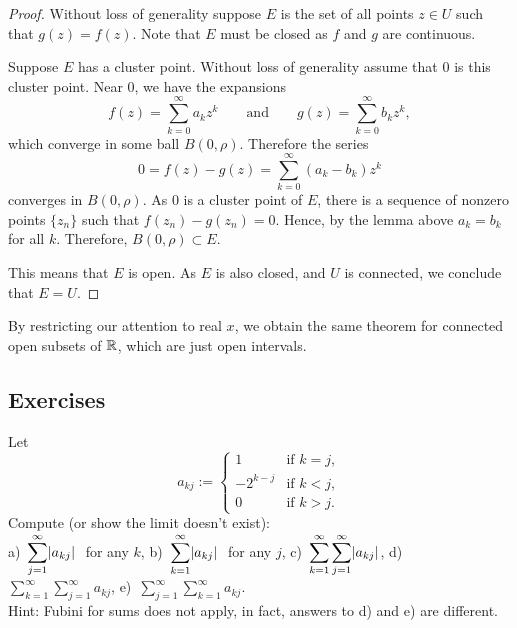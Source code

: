 \begin{proof}
Without loss of generality suppose $E$ is the set of all points $z \in U$ such that
$g(z)=f(z)$.  Note that $E$ must be closed as $f$ and $g$ are continuous.

Suppose $E$ has a cluster point.  Without loss of generality assume that $0$
is this cluster point.  Near $0$,
we have the expansions
\begin{equation*}
f(z) = \sum_{k=0}^\infty a_k {z}^k 
\qquad
\text{and}
\qquad
g(z) = \sum_{k=0}^\infty b_k {z}^k ,
\end{equation*}
which converge in some ball $B(0,\rho)$.  Therefore the series
\begin{equation*}
0 = f(z)-g(z) = 
\sum_{k=0}^\infty (a_k-b_k) z^k
\end{equation*}
converges in $B(0,\rho)$.  As $0$ is a cluster point of $E$, there
is a sequence of nonzero points $\{ z_n \}$ such that
$f(z_n) -g(z_n) = 0$.  Hence, by the lemma above 
$a_k = b_k$ for all $k$.  Therefore, $B(0,\rho) \subset E$.

This means that $E$ is open.  As $E$ is also closed, and $U$ is connected, we conclude that $E = U$.
\end{proof}

By restricting our attention to real $x$, we obtain the same
theorem for connected open subsets of ${\mathbb{R}}$, which are just open intervals.

\subsection{Exercises}

\begin{exercise}
Let
\begin{equation*}
a_{kj} :=
\begin{cases}
1        & \text{if } k=j,\\
-2^{k-j} & \text{if } k<j,\\
0        & \text{if } k>j.
\end{cases}
\end{equation*}
Compute (or show the limit doesn't exist):
\\
a)~$\displaystyle \sum_{j=1}^\infty \lvert {a_{kj}} \rvert~$ for any $k$,
\hspace{\fill}
b)~$\displaystyle \sum_{k=1}^\infty \lvert {a_{kj}} \rvert~$ for any $j$,
\hspace{\fill}
c)~$\displaystyle \sum_{k=1}^\infty \sum_{j=1}^\infty \lvert {a_{kj}} \rvert$,
\hspace{\fill}
d)~$\displaystyle \sum_{k=1}^\infty \sum_{j=1}^\infty a_{kj}$,
\hspace{\fill}
e)~$\displaystyle \sum_{j=1}^\infty \sum_{k=1}^\infty a_{kj}$.
\\
Hint: Fubini for sums does not apply, in fact, answers to
d) and e) are different.
\end{exercise}

